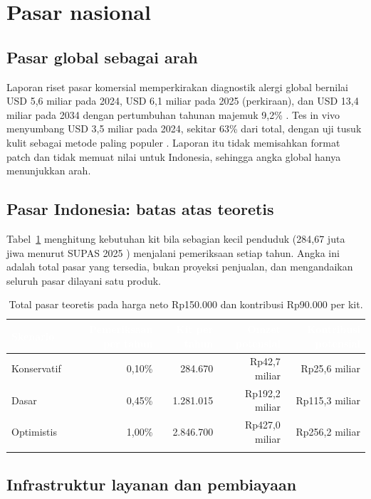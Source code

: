 \documentclass[11pt,a4paper]{article}
\newcommand{\tH}[1]{\textcolor{white}{\sffamily\bfseries\small #1}}
\newcommand{\tabstart}{\small\rowcolors{2}{white}{pale}\arrayrulecolor{rule}}
\newcommand{\hdrrow}{\rowcolor{tealdark}}
\renewcommand{\toprule}{\arrayrulecolor{tealdark}\specialrule{0.9pt}{0pt}{0pt}\arrayrulecolor{rule}}
\renewcommand{\bottomrule}{\arrayrulecolor{tealdark}\specialrule{0.9pt}{0pt}{0pt}\arrayrulecolor{rule}}
\begin{document}
\section{Pasar nasional}

\subsection{Pasar global sebagai arah}

Laporan riset pasar komersial memperkirakan diagnostik alergi global bernilai USD 5,6 miliar pada 2024, USD 6,1 miliar pada 2025 (perkiraan), dan USD 13,4 miliar pada 2034 dengan pertumbuhan tahunan majemuk 9,2\% \cite{gmi,rm}. Tes in vivo menyumbang USD 3,5 miliar pada 2024, sekitar 63\% dari total, dengan uji tusuk kulit sebagai metode paling populer \cite{gmi}. Laporan itu tidak memisahkan format patch dan tidak memuat nilai untuk Indonesia, sehingga angka global hanya menunjukkan arah.

\subsection{Pasar Indonesia: batas atas teoretis}

Tabel~\ref{tab:tam} menghitung kebutuhan kit bila sebagian kecil penduduk (284,67 juta jiwa menurut SUPAS 2025 \cite{bps}) menjalani pemeriksaan setiap tahun. Angka ini adalah total pasar yang tersedia, bukan proyeksi penjualan, dan mengandaikan seluruh pasar dilayani satu produk.

\begin{table}[htbp]
\centering
\caption{Total pasar teoretis pada harga neto Rp150.000 dan kontribusi Rp90.000 per kit.}
\label{tab:tam}
\tabstart
\begin{tabular}{@{}lrrrr@{}}
\toprule
\hdrrow\tH{Skenario} & \tH{Pemeriksaan per tahun} & \tH{Kit per tahun} & \tH{Omzet potensial} & \tH{Kontribusi potensial} \\
\midrule
Konservatif & 0,10\% & 284.670 & Rp42,7 miliar & Rp25,6 miliar \\
Dasar & 0,45\% & 1.281.015 & Rp192,2 miliar & Rp115,3 miliar \\
Optimistis & 1,00\% & 2.846.700 & Rp427,0 miliar & Rp256,2 miliar \\
\bottomrule
\end{tabular}
\end{table}

\subsection{Infrastruktur layanan dan pembiayaan}
\end{document}

